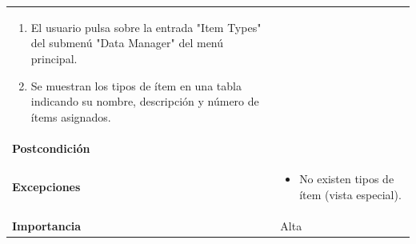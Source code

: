 \documentclass[
]{article}
\providecommand{\tightlist}{%
  \setlength{\itemsep}{0pt}\setlength{\parskip}{0pt}}
\begin{document}
\begin{longtable}[]{@{}ll@{}}
\begin{minipage}[t]{0.76\columnwidth}
\begin{enumerate}
\def\labelenumi{\arabic{enumi}.}
\tightlist
\item
  El usuario pulsa sobre la entrada "Item Types" del submenú "Data
  Manager" del menú principal.
\item
  Se muestran los tipos de ítem en una tabla indicando su nombre,
  descripción y número de ítems asignados.
\end{enumerate}\strut
\end{minipage}\tabularnewline
\begin{minipage}[t]{0.18\columnwidth}\raggedright
\textbf{Postcondición}\strut
\end{minipage} & \begin{minipage}[t]{0.76\columnwidth}\raggedright
\strut
\end{minipage}\tabularnewline
\begin{minipage}[t]{0.18\columnwidth}\raggedright
\textbf{Excepciones}\strut
\end{minipage} & \begin{minipage}[t]{0.76\columnwidth}\raggedright
\begin{itemize}
\tightlist
\item
  No existen tipos de ítem (vista especial).
\end{itemize}\strut
\end{minipage}\tabularnewline
\begin{minipage}[t]{0.18\columnwidth}\raggedright
\textbf{Importancia}\strut
\end{minipage} & \begin{minipage}[t]{0.76\columnwidth}\raggedright
Alta\strut
\end{minipage}\tabularnewline
\bottomrule
\end{longtable}
\end{document}
